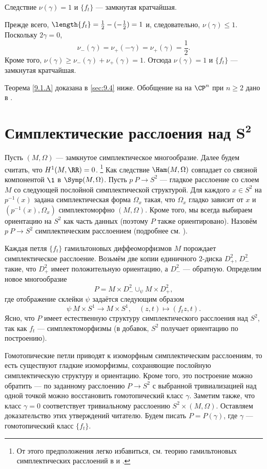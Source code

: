 \begin{thm}[(\cite{LM2})]{Следствие} $\nu(\gamma) = 1$ и $\{f_t\}$ --- замкнутая кратчайшая.
\end{thm}

Прежде всего, $\length\{f_t\} =\frac12 - (-\frac12 ) = 1$ и, следовательно, $\nu(\gamma) \le 1$.
Поскольку $2\gamma = 0$, 
\[\nu_- (\gamma) = \nu_+ (-\gamma) = \nu_+ (\gamma) =\frac12.\]
Кроме того, $\nu(\gamma) \ge \nu_- (\gamma) + \nu_+ (\gamma) = 1$.
Отсюда $\nu(\gamma) = 1$ и $\{f_t\}$ --- замкнутая кратчайшая.

Теорема \ref{9.1.A} доказана в \ref{sec:9.4} ниже.
Обобщение на на $\CP^n$ при $n \ge 2$ дано в \cite{P3}.


\section[\texorpdfstring{Симплектические расслоения над $S^2$}{Симплектические расслоения над S²}]{Симплектические расслоения над $\bm{S^2}$}

Пусть $(M, \Omega)$ --- замкнутое симплектическое многообразие.
Далее будем считать, что $H^1 (M, \RR) = 0$.%
\footnote{От этого предположения легко избавиться, см. теорию гамильтоновых симплектических расслоений в \cite{MS} и \cite{P4}.}
Как следствие $\Ham(M, \Omega)$ совпадает со связной компонентой $\1$ в $\Symp(M, \Omega)$.
Пусть $p \: P \to S^2$ --- гладкое расслоение со слоем $M$ со следующей послойной симплектической структурой.
Для каждого $x \in S^2$ на $p^{-1} (x)$ задана симплектическая форма $\Omega_x$ такая, что $\Omega_x$ гладко зависит от $x$ и $(p^{-1} (x), \Omega_x)$  симплектоморфно $(M, \Omega)$.
Кроме того, мы всегда выбираем ориентацию на $S^2$ как часть данных (поэтому $P$ также ориентировано).
Назовём $p\: P\to S^2$ симплектическим расслоением (подробнее см. \cite{MS}).

Каждая петля $\{f_t\}$ гамильтоновых диффеоморфизмов $M$ порождает симплектическое расслоение.
Возьмём две копии единичного $2$-диска $D_+^2$, $D_-^2$ такие, что $D_+^2$ имеет положительную ориентацию, а $D_-^2$ --- обратную.
Определим новое многообразие
\[P =  M  \times D_-^2 \cup_\psi M \times D_+^2,\]
где отображение склейки $\psi$ задаётся следующим образом
\[\psi \: M \times S^1 \to M \times S^1,\quad (z, t) \mapsto (f_t z, t).\]
Ясно, что $P$ имеет естественную структуру симплектического расслоения над $S^2$, так как $f_t$ --- симплектоморфизмы (в добавок, $S^2$ получает ориентацию по построению).

Гомотопические петли приводят к изоморфным симплектическим расслоениям, то есть существуют гладкие изоморфизмы, сохраняющие послойную симплектическую структуру и ориентацию.
Кроме того, это построение можно обратить --- по заданному расслоению $P \to S^2$ с выбранной тривиализацией над одной точкой можно восстановить гомотопический класс $\gamma$.
Заметим также, что класс $\gamma = 0$ соответствует тривиальному расслоению $S^2 \times (M, \Omega)$.
Оставляем доказательство этих утверждений читателю.
Будем писать $P = P(\gamma)$, где $\gamma$ --- гомотопический класс $\{f_t\}$.

